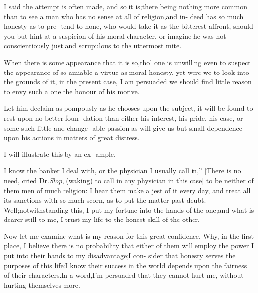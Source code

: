 \documentclass{article}
\begin{document}
\lqq I said the attempt is often made,\break
\lqq and so it is;\tsh there being nothing
\lqq more common than to see a man who\break
\lqq has no sense at all of religion,\tsk and in-\break
\lqq deed has so much honesty as to pre-\break
\lqq tend to none, who would take it as the\break
\lqq bitterest affront, should you but hint at\break
\lqq a suspicion of his moral character,\tsh\break
\lqq or imagine he was not conscientiously\break
\lqq just and scrupulous to the uttermost\break
\lqq mite.

\lqq When there is some appearance that\break
\lqq it is so,\tsk tho’ one is unwilling even to\break
\lqq suspect the appearance of so amiable a\break
\lqq virtue as moral honesty, yet were we\break
\lqq to look into the grounds of it, in the\break
\lqq present case, I am persuaded we should\break
\lqq find little reason to envy such a one\break
\lqq the honour of his motive.

\lqq Let him declaim as pompously as\break
\lqq he chooses upon the subject, it will
\lqq be found to rest upon no better foun-\break
\lqq dation than either his interest, his pride,\break
\lqq his ease, or some such little and change-\break
\lqq able passion as will give us but small\break
\lqq dependence upon his actions in matters\break
\lqq of great distress.

\lqq I will illustrate this by an ex-\break
\lqq ample.

\lqq I know the banker I deal with, or\break
\lqq the physician I usually call in,” [There\break
is no need, cried Dr.\@ \textit{Slop}, (waking) to call\break
in any physician in this case] \lqq to be\break
\lqq neither of them men of much religion:\break
\lqq I hear them make a jest of it every\break
\lqq day, and treat all its sanctions with so\break
\lqq much scorn, as to put the matter past\break
\lqq doubt.  Well;\tsk notwithstanding this,\break
\lqq I put my fortune into the hands of the\break
\lqq one;\tsk and what is dearer still to me,
\lqq I trust my life to the honest skill of\break
\lqq the other.

\lqq Now let me examine what is my\break
\lqq reason for this great confidence.\tsh\break
\lqq Why, in the first place, I believe there\break
\lqq is no probability that either of them\break
\lqq will employ the power I put into their\break
\lqq hands to my disadvantage;\tsk I con-\break
\lqq sider that honesty serves the purposes\break
\lqq of this life:\tsk I know their success in\break
\lqq the world depends upon the fairness of\break
\lqq their characters.\tsk In a word,\tsk I’m\break
\lqq persuaded that they cannot hurt me,\break
\lqq without hurting themselves more.
\end{document}
